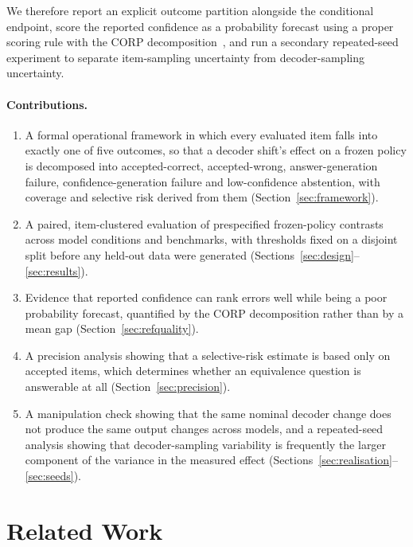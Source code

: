\documentclass[information,article,submit,moreauthors]{Definitions/mdpi}
\begin{document}
We therefore report an explicit outcome partition alongside the conditional
endpoint, score the reported confidence as a probability forecast using a proper
scoring rule with the CORP decomposition~\cite{brier1950,dimitriadis2021corp},
and run a secondary repeated-seed experiment to separate item-sampling
uncertainty from decoder-sampling uncertainty.

\paragraph{Contributions.}
\begin{enumerate}[leftmargin=*,labelsep=4.5mm]
\item A formal operational framework in which every evaluated item falls into
exactly one of five outcomes, so that a decoder shift's effect on a frozen
policy is decomposed into accepted-correct, accepted-wrong, answer-generation
failure, confidence-generation failure and low-confidence abstention, with
coverage and selective risk derived from them (Section~\ref{sec:framework}).
\item A paired, item-clustered evaluation of \NumContrasts{} prespecified
frozen-policy contrasts across \NumModelsConditions{} model conditions and
\NumDatasets{} benchmarks, with thresholds fixed on a disjoint split before any
held-out data were generated (Sections~\ref{sec:design}--\ref{sec:results}).
\item Evidence that reported confidence can rank errors well while being a poor
probability forecast, quantified by the CORP decomposition rather than by a mean
gap (Section~\ref{sec:refquality}).
\item A precision analysis showing that a selective-risk estimate is based only
on accepted items, which determines whether an equivalence question is
answerable at all (Section~\ref{sec:precision}).
\item A manipulation check showing that the same nominal decoder change does
not produce the same output changes across models, and a repeated-seed analysis
showing that decoder-sampling variability is frequently the larger component of
the variance in the measured effect
(Sections~\ref{sec:realisation}--\ref{sec:seeds}).
\end{enumerate}

\section{Related Work}
\end{document}

